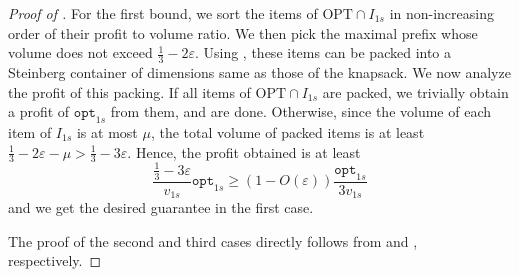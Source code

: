 \documentclass[10pt,a4paper]{amsart}
\renewcommand{\epsilon}{\varepsilon} %
\theoremstyle{definition}
\newcommand{\optones}{\mathtt{opt}_{1s}}
\newcommand{\vones}{v_{1s}}
\begin{document}
\begin{proof}[Proof of ]
     For the first bound, we sort the items of $\text{OPT}\cap I_{1s}$ in non-increasing order of their profit to volume ratio. We then pick the maximal prefix whose volume does not exceed $\frac{1}{3}-2\epsilon$. Using , these items can be packed into a Steinberg container of dimensions same as those of the knapsack. We now analyze the profit of this packing. If all items of $\text{OPT}\cap I_{1s}$ are packed, we trivially obtain a profit of $\optones$ from them, and are done. Otherwise, since the volume of each item of $I_{1s}$ is at most $\mu$, the total volume of packed items is at least $\frac{1}{3}- 2\epsilon -\mu > \frac{1}{3}-3\epsilon$. Hence, the profit obtained is at least 
    \[ \frac{\frac{1}{3}-3\epsilon}{\vones}\optones \ge (1-O(\epsilon))\frac{\optones}{3\vones}\]
    and we get the desired guarantee in the first case. 

    The proof of the second and third cases directly follows from  and , respectively.
\end{proof}

  
\end{document}
